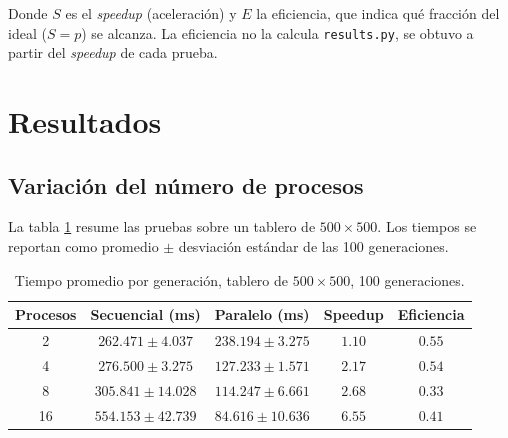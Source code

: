 \documentclass{article}
\begin{document}
Donde $S$ es el \textit{speedup} (aceleración) y $E$ la eficiencia, que indica qué fracción del ideal ($S = p$) se alcanza. La eficiencia no la calcula \verb|results.py|, se obtuvo a partir del \textit{speedup} de cada prueba.

\section{Resultados}

\subsection{Variación del número de procesos}
La tabla \ref{tab:procesos} resume las pruebas sobre un tablero de $500 \times 500$. Los tiempos se reportan como promedio $\pm$ desviación estándar de las 100 generaciones.

\begin{table}[H]
    \centering
    \begin{tabular}{|c|c|c|c|c|}
        \hline
        \textbf{Procesos} & \textbf{Secuencial (ms)} & \textbf{Paralelo (ms)} & \textbf{Speedup} & \textbf{Eficiencia} \\
        \hline
        2  & $262.471 \pm 4.037$  & $238.194 \pm 3.275$  & $1.10$ & $0.55$ \\
        4  & $276.500 \pm 3.275$  & $127.233 \pm 1.571$  & $2.17$ & $0.54$ \\
        8  & $305.841 \pm 14.028$ & $114.247 \pm 6.661$  & $2.68$ & $0.33$ \\
        16 & $554.153 \pm 42.739$ & $84.616 \pm 10.636$  & $6.55$ & $0.41$ \\
        \hline
    \end{tabular}
    \caption{Tiempo promedio por generación, tablero de $500 \times 500$, 100 generaciones.}
    \label{tab:procesos}
\end{table}
\end{document}
